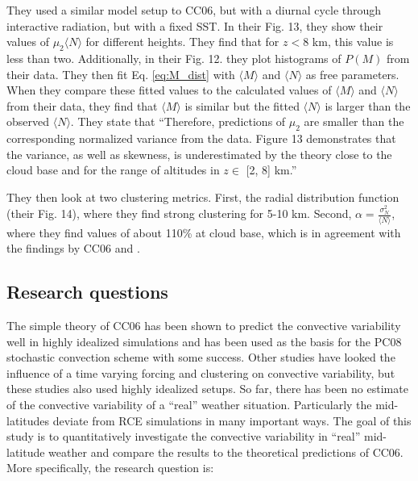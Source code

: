 \documentclass[a4paper, 12pt, draft]{article}
\begin{document}
\subsubsection{\cite{Davoudi2010}}
They used a similar model setup to CC06, but with a diurnal cycle through interactive radiation, but with a fixed SST. In their Fig. 13, they show their values of $\mu_2 \langle N \rangle$ for different heights. They find that for $z <$8 km, this value is less than two. Additionally, in their Fig. 12. they plot histograms of $P(M)$ from their data. They then fit Eq. \ref{eq:M_dist} with $\langle M \rangle$ and $\langle N \rangle$ as free parameters. When they compare these fitted values to the calculated values of $\langle M \rangle$ and $\langle N \rangle$ from their data, they find that $\langle M \rangle$  is similar but the fitted $\langle N \rangle$ is larger than the observed $\langle N \rangle$. They state that ``Therefore, predictions of $\mu_2$ are smaller than the corresponding normalized variance from the data. Figure 13 demonstrates that the variance, as well as skewness, is underestimated by the theory close to the cloud base and for the range of altitudes in $z \in$  [2, 8] km.''

They then look at two clustering metrics. First, the radial distribution function (their Fig. 14), where they find strong clustering for 5-10 km. Second, $\alpha = \frac{\sigma_N^2}{\langle N \rangle}$, where they find values of about 110\% at cloud base, which is in agreement with the findings by CC06 and \cite{Davies2008}. 

\subsection{Research questions}
The simple theory of CC06 has been shown to predict the convective variability well in highly idealized simulations and has been used as the basis for the PC08 stochastic convection scheme with some success. Other studies have looked the influence of a time varying forcing and clustering on convective variability, but these studies also used highly idealized setups. So far, there has been no estimate of the convective variability of a ``real'' weather situation. Particularly the mid-latitudes deviate from RCE simulations in many important ways. The goal of this study is to quantitatively investigate the convective variability in ``real'' mid-latitude weather and compare the results to the theoretical predictions of CC06. More specifically, the research question is:
\end{document}
